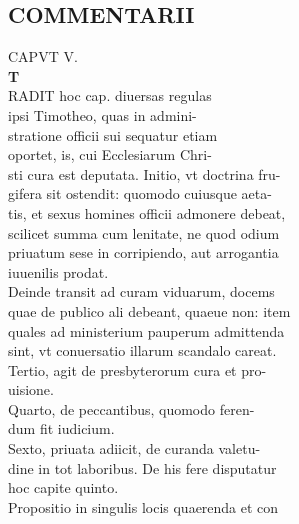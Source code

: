 \documentclass{article}
\begin{document}
\begin{pages}
\section*{COMMENTARII \\
                }CAPVT V. \\
                
\textbf{T \\
                }RADIT hoc cap. diuersas regulas \\
                ipsi Timotheo, quas in admini- \\
                stratione officii sui sequatur etiam \\
                oportet, is, cui Ecclesiarum Chri- \\
                sti cura est deputata. Initio, vt doctrina fru- \\
                gifera sit ostendit: quomodo cuiusque aeta- \\
                tis, et sexus homines officii admonere debeat, \\
                scilicet summa cum lenitate, ne quod odium \\
                priuatum sese in corripiendo, aut arrogantia \\
                iuuenilis prodat. \\
                Deinde transit ad curam viduarum, docems \\
                quae de publico ali debeant, quaeue non: item \\
                quales ad ministerium pauperum admittenda \\
                sint, vt conuersatio illarum scandalo careat. \\
                Tertio, agit de presbyterorum cura et pro- \\
                uisione. \\
                Quarto, de peccantibus, quomodo feren- \\
                dum fit iudicium. \\
                Sexto, priuata adiicit, de curanda valetu- \\
                dine in tot laboribus. De his fere disputatur \\
                hoc capite quinto. \\
                Propositio in singulis locis quaerenda et con \\
                

\end{pages}
\end{document}
